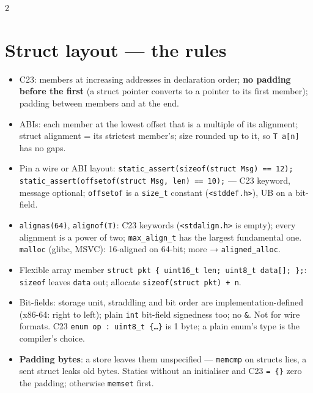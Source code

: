 \documentclass[8pt]{extarticle}
\newcommand\ct[1]{\texttt{#1}}
\begin{document}
\begin{multicols}{2}
\section{Struct layout — the rules}
\begin{itemize}
  \item C23: members at increasing addresses in declaration order; \textbf{no padding before the
        first} (a struct pointer converts to a pointer to its first member); padding between
        members and at the end.
  \item ABIs: each member at the lowest offset that is a multiple of its alignment; struct
        alignment = its strictest member's; size rounded up to it, so \ct{T a[n]} has no gaps.
  \item Pin a wire or ABI layout: \ct{static\_assert(sizeof(struct Msg) == 12);}
        \ct{static\_assert(offsetof(struct Msg, len) == 10);} — C23 keyword, message optional;
        \ct{offsetof} is a \ct{size\_t} constant (\ct{<stddef.h>}), UB on a bit-field.
  \item \ct{alignas(64)}, \ct{alignof(T)}: C23 keywords (\ct{<stdalign.h>} is empty); every
        alignment is a power of two; \ct{max\_align\_t} has the largest fundamental one.
        \ct{malloc} (glibc, MSVC): 16-aligned on 64-bit; more → \ct{aligned\_alloc}.
  \item Flexible array member \ct{struct pkt \{ uint16\_t len; uint8\_t data[]; \};}:
        \ct{sizeof} leaves \ct{data} out; allocate \ct{sizeof(struct pkt) + n}.
  \item Bit-fields: storage unit, straddling and bit order are implementation-defined (x86-64:
        right to left); plain \ct{int} bit-field signedness too; no \ct{\&}. Not for wire formats.
        C23 \ct{enum op : uint8\_t \{…\}} is 1 byte; a plain enum's type is the compiler's choice.
  \item \textbf{Padding bytes}: a store leaves them unspecified — \ct{memcmp} on structs lies, a
        sent struct leaks old bytes. Statics without an initialiser and C23 \ct{= \{\}} zero
        the padding; otherwise \ct{memset} first.
\end{itemize}


\end{multicols}
\end{document}
